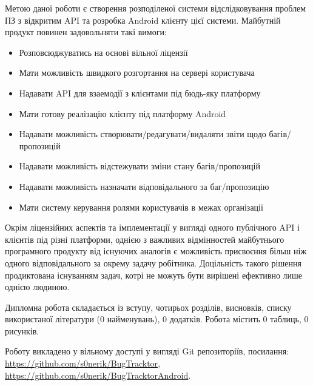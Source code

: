 \documentclass[../main.tex]{subfiles}
\begin{document}
Метою даної роботи є створення розподіленої системи відслідковування проблем ПЗ з відкритим API та розробка Android клієнту цієї системи. Майбутній продукт повинен задовольняти такі вимоги:
\begin{itemize}
\item Розповсюджуватись на основі вільної ліцензії
\item Мати можливість швидкого розгортання на сервері користувача
\item Надавати API для взаемодії з клієнтами під бюдь-яку платформу
\item Мати готову реалізацію клієнту під платформу Android
\item Надавати можливість створювати/редагувати/видаляти звіти щодо багів/пропозицій
\item Надавати можливість відстежувати зміни стану багів/пропозицій
\item Надавати можливість назначати відповідального за баг/пропозицію
\item Мати систему керування ролями користувачів в межах організації
\end{itemize}

Окрім ліцензійних аспектів та імплементації у вигляді одного публічного API і клієнтів під різні платформи, однією з важливих відмінностей майбутнього програмного продукту від існуючих аналогів є можливість присвоєння більш ніж одного відповідального за окрему задачу робітника. Доцільність такого рішення продиктована існуванням задач, котрі не можуть бути вирішені ефективно лише однією людиною.

Дипломна робота складається із вступу, чотирьох розділів, висновків, списку використаної літератури (0 найменувань), 0 додатків. Робота містить 0 таблиць, 0  рисунків.

Роботу викладено у вільному доступі у вигляді Git репозиторіїв, посилання: \url{https://github.com/s0nerik/BugTracktor}, \url{https://github.com/s0nerik/BugTracktorAndroid}.
\end{document}
